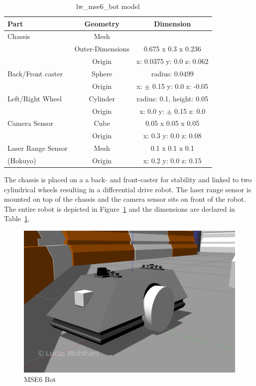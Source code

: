 \documentclass[10pt,journal,compsoc]{IEEEtran}
\begin{document}
\begin{table}[h]
      \caption{lw\_mse6\_bot model}
      \label{tab:lw_mse6_bot_model}
      \begin{center}
            \begin{tabular}{|l||c|c|} 
                  \hline
                  Part & Geometry & Dimension\\ \hline \hline
                  Chassis & Mesh &  \\ 
                        & Outer-Dimensions & 0.675 x 0.3 x 0.236 \\
                        & Origin & x: 0.0375 y: 0.0 z: 0.062 \\ \hline 
                  Back/Front caster & Sphere & radius: 0.0499 \\ 
                  & Origin & x: $\pm$ 0.15 y: 0.0 z: -0.05 \\ \hline 
                  Left/Right Wheel & Cylinder & radius: 0.1, height: 0.05 \\ 
                  & Origin & x: 0.0 y: $\pm$ 0.15 z: 0.0 \\ \hline \hline  
                  Camera Sensor & Cube &  0.05 x 0.05 x 0.05\\ 
                  & Origin & x: 0.3 y: 0.0 z: 0.08 \\ \hline 
                  Laser Range Sensor & Mesh &  0.1 x 0.1 x 0.1\\ 
                  (Hokuyo)  & Origin & x: 0.2 y: 0.0 z: 0.15 \\ \hline  
            \end{tabular}
      \end{center}
\end{table}

The chassis is placed on a a back- and front-caster for stability and linked to two cylindrical wheels resulting in a differential drive robot. The laser range sensor is mounted on top of the chassis and the camera sensor sits on front of the robot.
The entire robot is depicted in Figure~\ref{fig:mse6_bot} and the dimensions are declared in Table~\ref{tab:lw_mse6_bot_model}.


\begin{figure}[thpb]
      \centering
      \includegraphics[width=\linewidth]{img/lw_mse6_bot}
      \caption{MSE6 Bot}
      \label{fig:mse6_bot}
\end{figure}
\end{document}
